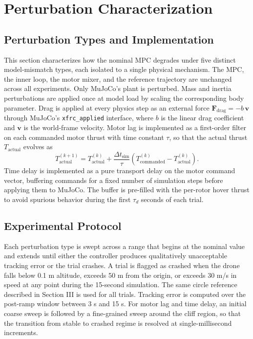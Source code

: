 \documentclass[conference]{IEEEtran}
\begin{document}
\section{Perturbation Characterization}

\subsection{Perturbation Types and Implementation}
This section characterizes how the nominal MPC degrades under five distinct model-mismatch types, each isolated to a single physical mechanism. The MPC, the inner loop, the motor mixer, and the reference trajectory are unchanged across all experiments. Only MuJoCo's plant is perturbed. Mass and inertia perturbations are applied once at model load by scaling the corresponding body parameter. Drag is applied at every physics step as an external force $\mathbf{F}_{\text{drag}} = -b\, \mathbf{v}$ through MuJoCo's \texttt{xfrc\_applied} interface, where $b$ is the linear drag coefficient and $\mathbf{v}$ is the world-frame velocity. Motor lag is implemented as a first-order filter on each commanded motor thrust with time constant $\tau$, so that the actual thrust $T_{\text{actual}}$ evolves as
\begin{equation}
T_{\text{actual}}^{(k+1)} = T_{\text{actual}}^{(k)} + \frac{\Delta t_{\text{sim}}}{\tau} \left( T_{\text{commanded}}^{(k)} - T_{\text{actual}}^{(k)} \right).
\end{equation}
Time delay is implemented as a pure transport delay on the motor command vector, buffering commands for a fixed number of simulation steps before applying them to MuJoCo. The buffer is pre-filled with the per-rotor hover thrust to avoid spurious behavior during the first $\tau_d$ seconds of each trial.

\subsection{Experimental Protocol}
Each perturbation type is swept across a range that begins at the nominal value and extends until either the controller produces qualitatively unacceptable tracking error or the trial crashes. A trial is flagged as crashed when the drone falls below 0.1 m altitude, exceeds 50 m from the origin, or exceeds 30 m/s in speed at any point during the 15-second simulation. The same circle reference described in Section III is used for all trials. Tracking error is computed over the post-ramp window between 3 s and 15 s. For motor lag and time delay, an initial coarse sweep is followed by a fine-grained sweep around the cliff region, so that the transition from stable to crashed regime is resolved at single-millisecond increments.
\end{document}
